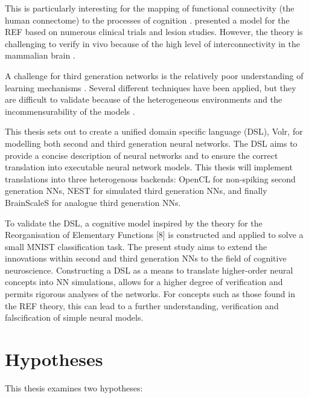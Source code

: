 \documentclass[report.tex]{subfiles}
\begin{document}
This is particularly interesting for the
mapping of functional connectivity (the human connectome) to the
processes of cognition \autocite{Eliasmith2015, Mogensen2011}. 
\textcite{Mogensen2011} presented a model for the 
\gls{REF} based on numerous clinical trials and lesion studies.
However, the theory is challenging to verify in vivo because of
the high level of interconnectivity in the mammalian brain
\autocite{Hohwy2009, Mogensen2017}.

A challenge for third generation networks is the relatively
poor understanding of learning mechanisms \autocite{Tavanei2015,
Walter2015}.
Several different techniques have been applied, but they are
difficult to validate because of the heterogeneous environments and
the incommensurability of the models \autocite{Bohte2002, Bruderle2011}.

This thesis sets out to create a unified domain specific language (DSL), Volr, 
for modelling both second and third generation neural networks.
The DSL aims to provide a concise description of neural networks and to 
ensure the correct translation into executable neural network models.
This thesis will implement translations into three heterogenous backends: 
\gls{OpenCL} for non-spiking second generation \gls{NN}s, NEST for simulated third
generation \gls{NN}s, and finally
BrainScaleS for analogue third generation \gls{NN}s.


To validate the DSL, a cognitive model inspired by the theory for the Reorganisation
of Elementary Functions [8] is constructed and applied to solve a small MNIST classification task.
The present study aims to extend the innovations within
second and third generation \gls{NN}s to the field of
cognitive  neuroscience. 
Constructing a \gls{DSL} as a means to translate higher-order
neural concepts into \gls{NN} simulations, allows for a higher
degree of verification and permits rigorous analyses of the networks.
For concepts such as those found in the \gls{REF} theory, 
this can lead to a further understanding, verification and falscification
of simple neural models.

\section{Hypotheses} \label{sec:hypotheses}
This thesis examines two hypotheses:
\end{document}
